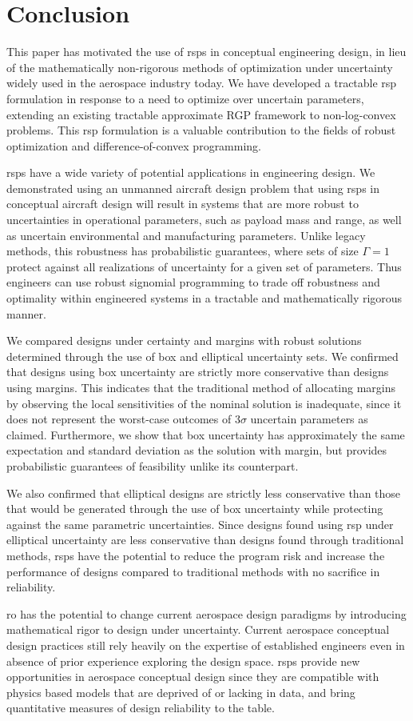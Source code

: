 \section{Conclusion}

This paper has motivated the use of \gls{rsp}s in conceptual engineering
design, in lieu of the mathematically non-rigorous methods of optimization under uncertainty
widely used in the aerospace industry today. We have developed a tractable \gls{rsp} formulation
in response to a need to optimize over uncertain parameters, extending an
existing tractable approximate RGP framework to non-log-convex problems.
This \gls{rsp} formulation is a valuable contribution to the fields of robust
optimization and difference-of-convex programming.

\gls{rsp}s have a wide variety of potential applications in engineering design.
We demonstrated using an unmanned aircraft design problem
that using \gls{rsp}s in conceptual aircraft design will result in systems
that are more robust to uncertainties in operational parameters,
such as payload mass and range, as well as uncertain environmental and manufacturing parameters.
Unlike legacy methods, this robustness has probabilistic guarantees, where sets of size $\Gamma=1$
protect against all realizations of uncertainty for a given set of parameters.
Thus engineers can use robust signomial programming to trade off
robustness and optimality within engineered systems in a tractable and mathematically rigorous manner.

We compared designs under certainty and margins with robust solutions
determined through the use of box and elliptical uncertainty sets. We
confirmed that designs using box uncertainty are strictly more conservative
than designs using margins. This indicates that the traditional method of allocating margins
by observing the local sensitivities of the nominal solution is inadequate, since it does not
represent the worst-case outcomes of $3\sigma$ uncertain parameters as claimed.
Furthermore, we show that box uncertainty
has approximately the same expectation and standard deviation as the solution with margin,
but provides probabilistic guarantees of feasibility unlike its counterpart.

We also confirmed that elliptical designs are strictly less conservative
than those that would be generated through the use of box uncertainty while protecting against the same
parametric uncertainties. Since designs found using \gls{rsp}
under elliptical uncertainty are less conservative
than designs found through traditional methods, \gls{rsp}s have the potential to reduce
the program risk and increase the performance
of designs compared to traditional methods with no sacrifice in reliability.

\gls{ro} has the potential to change current aerospace design paradigms by introducing
mathematical rigor to design under uncertainty. Current aerospace
conceptual design practices still rely heavily on the expertise of established
engineers even in absence of prior experience exploring the design space.
\gls{rsp}s provide new opportunities in aerospace conceptual design
since they are compatible with physics based models
that are deprived of or lacking in data, and bring quantitative
measures of design reliability to the table.

